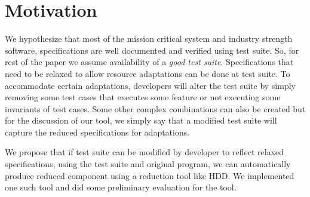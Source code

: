 \section{Motivation}

We hypothesize that most of the mission critical system and industry strength software, specifications are well documented and verified using test suite. So, for rest of the paper we assume availability of a \emph{good test suite}. Specifications that need to be relaxed to allow resource adaptations can be done at test suite. To accommodate certain adaptations, developers will alter the test suite by simply removing some test cases that executes some feature or not executing some invariants of test cases. Some other complex combinations can also be created but for the discussion of our tool, we simply say that a modified test suite will capture the reduced specifications for adaptations. 

We propose that if test suite can be modified by developer to reflect relaxed specifications, using the test suite and original program, we can automatically produce reduced component using a reduction tool like HDD. We implemented one such tool and did some preliminary evaluation for the tool.       